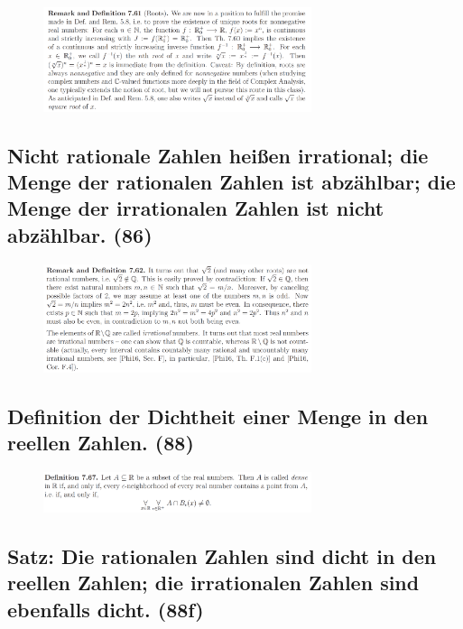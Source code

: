 \begin{figure}[H] \centering
\includegraphics[width=0.7\textwidth]{media/7-20.png}
\end{figure}

\subsection{Nicht rationale Zahlen heißen irrational; die Menge der rationalen Zahlen ist abzählbar; die Menge der irrationalen Zahlen ist nicht abzählbar. (86)} 

\begin{figure}[H] \centering
\includegraphics[width=0.7\textwidth]{media/7-21.png}
\end{figure}

\subsection{Definition der Dichtheit einer Menge in den reellen Zahlen. (88)}

\begin{figure}[H] \centering
\includegraphics[width=0.7\textwidth]{media/7-22.png}
\end{figure}

\subsection{Satz: Die rationalen Zahlen sind dicht in den reellen Zahlen; die irrationalen Zahlen sind ebenfalls dicht. (88f)}

